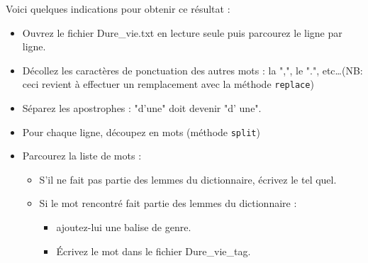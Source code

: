 Voici quelques indications pour obtenir ce résultat :
\begin{itemize}
 \item Ouvrez le fichier Dure\_vie.txt en lecture seule puis parcourez le ligne par ligne.
 \item Décollez les caractères de ponctuation des autres mots : la ",", le ".", etc\dots (NB: ceci revient à effectuer un remplacement avec la méthode \texttt{replace})
 \item Séparez les apostrophes : "d'une" doit devenir "d' une".
 \item Pour chaque ligne, découpez en mots (méthode \texttt{split})%
 \item Parcourez la liste de mots :
\begin{itemize}
  \item S'il ne fait pas partie des lemmes du dictionnaire, écrivez le tel quel.
 \item Si le mot rencontré fait partie des lemmes du dictionnaire :
 \begin{itemize}
   \item ajoutez-lui une balise de genre.
   \item Écrivez le mot dans le fichier Dure\_vie\_tag.
 \end{itemize}
 \end{itemize}
\end{itemize}
